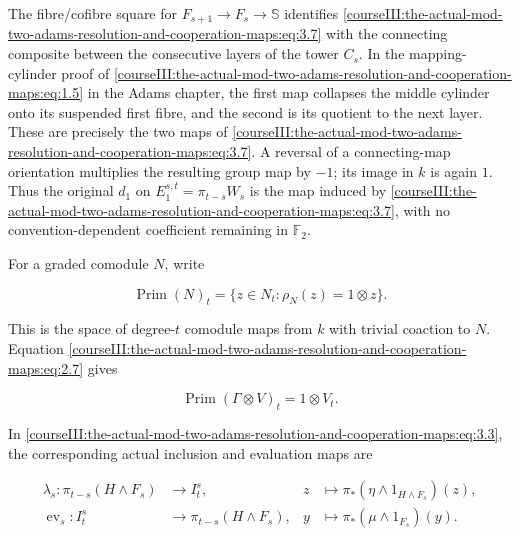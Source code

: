 The fibre/cofibre square for \(F_{s+1}\to F_s\to\mathbb S\) identifies \eqref{courseIII:the-actual-mod-two-adams-resolution-and-cooperation-maps:eq:3.7} with the connecting composite between the consecutive layers of the tower \(C_s\). In the mapping-cylinder proof of \eqref{courseIII:the-actual-mod-two-adams-resolution-and-cooperation-maps:eq:1.5} in the Adams chapter, the first map collapses the middle cylinder onto its suspended first fibre, and the second is its quotient to the next layer. These are precisely the two maps of \eqref{courseIII:the-actual-mod-two-adams-resolution-and-cooperation-maps:eq:3.7}. A reversal of a connecting-map orientation multiplies the resulting group map by \(-1\); its image in \(k\) is again \(1\). Thus the original \(d_1\) on \(E_1^{s,t}=\pi_{t-s}W_s\) is the map induced by \eqref{courseIII:the-actual-mod-two-adams-resolution-and-cooperation-maps:eq:3.7}, with no convention-dependent coefficient remaining in \(\mathbb F_2\).

For a graded comodule \(N\), write

\begin{equation}
\operatorname{Prim}(N)_t
 =\{z\in N_t:\rho_N(z)=1\otimes z\}.
 \label{courseIII:the-actual-mod-two-adams-resolution-and-cooperation-maps:eq:3.8}
\end{equation}

This is the space of degree-\(t\) comodule maps from \(k\) with trivial coaction to \(N\). Equation \eqref{courseIII:the-actual-mod-two-adams-resolution-and-cooperation-maps:eq:2.7} gives

\begin{equation}
\operatorname{Prim}(\Gamma\otimes V)_t=1\otimes V_t.
 \label{courseIII:the-actual-mod-two-adams-resolution-and-cooperation-maps:eq:3.9}
\end{equation}

In \eqref{courseIII:the-actual-mod-two-adams-resolution-and-cooperation-maps:eq:3.3}, the corresponding actual inclusion and evaluation maps are

\begin{equation}
\begin{aligned}
 \lambda_s:\pi_{t-s}(H\wedge F_s)&\longrightarrow I^s_t,
       &z&\longmapsto\pi_*(\eta\wedge1_{H\wedge F_s})(z),\\
 \operatorname{ev}_s:I^s_t&\longrightarrow\pi_{t-s}(H\wedge F_s),
       &y&\longmapsto\pi_*(\mu\wedge1_{F_s})(y).
 \end{aligned}
 \label{courseIII:the-actual-mod-two-adams-resolution-and-cooperation-maps:eq:3.10}
\end{equation}

